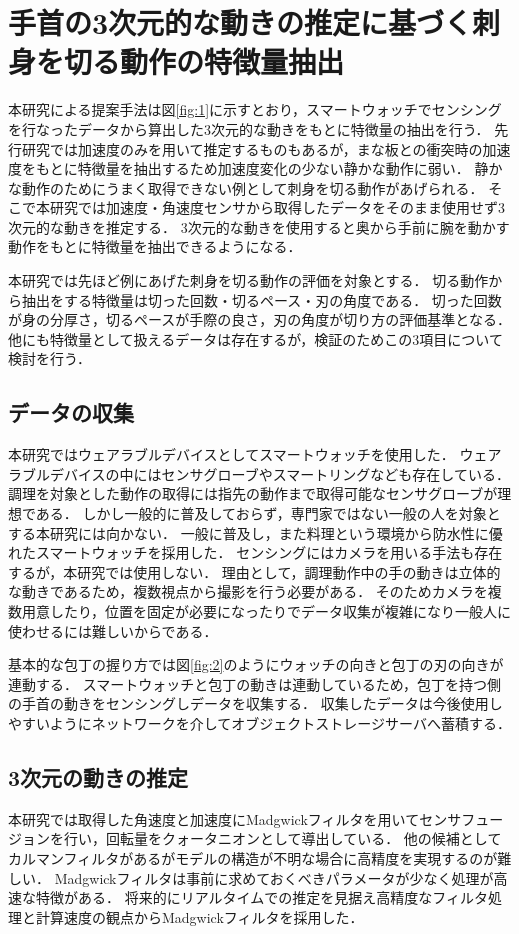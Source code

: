 \section{手首の3次元的な動きの推定に基づく刺身を切る動作の特徴量抽出}
本研究による提案手法は図\ref{fig:1}に示すとおり，スマートウォッチでセンシングを行なったデータから算出した3次元的な動きをもとに特徴量の抽出を行う．
先行研究\cite{kumazawaanalysis}では加速度のみを用いて推定するものもあるが，まな板との衝突時の加速度をもとに特徴量を抽出するため加速度変化の少ない静かな動作に弱い．
静かな動作のためにうまく取得できない例として刺身を切る動作があげられる．
そこで本研究では加速度・角速度センサから取得したデータをそのまま使用せず3次元的な動きを推定する．
3次元的な動きを使用すると奥から手前に腕を動かす動作をもとに特徴量を抽出できるようになる．

本研究では先ほど例にあげた刺身を切る動作の評価を対象とする．
切る動作から抽出をする特徴量は切った回数・切るペース・刃の角度である．
切った回数が身の分厚さ，切るペースが手際の良さ，刃の角度が切り方の評価基準となる．
他にも特徴量として扱えるデータは存在するが，検証のためこの3項目について検討を行う．



\subsection{データの収集}
本研究ではウェアラブルデバイスとしてスマートウォッチを使用した．
ウェアラブルデバイスの中にはセンサグローブやスマートリングなども存在している．
調理を対象とした動作の取得には指先の動作まで取得可能なセンサグローブが理想である．
しかし一般的に普及しておらず，専門家ではない一般の人を対象とする本研究には向かない．
一般に普及し，また料理という環境から防水性に優れたスマートウォッチを採用した．
センシングにはカメラを用いる手法も存在するが，本研究では使用しない．
理由として，調理動作中の手の動きは立体的な動きであるため，複数視点から撮影を行う必要がある．
そのためカメラを複数用意したり，位置を固定が必要になったりでデータ収集が複雑になり一般人に使わせるには難しいからである．

基本的な包丁の握り方では図\ref{fig:2}のようにウォッチの向きと包丁の刃の向きが連動する．
スマートウォッチと包丁の動きは連動しているため，包丁を持つ側の手首の動きをセンシングしデータを収集する．
収集したデータは今後使用しやすいようにネットワークを介してオブジェクトストレージサーバへ蓄積する．
\subsection{3次元の動きの推定}
本研究では取得した角速度と加速度にMadgwickフィルタを用いてセンサフュージョンを行い，回転量をクォータニオンとして導出している．
他の候補としてカルマンフィルタがあるがモデルの構造が不明な場合に高精度を実現するのが難しい．
Madgwickフィルタは事前に求めておくべきパラメータが少なく処理が高速な特徴がある．
将来的にリアルタイムでの推定を見据え高精度なフィルタ処理と計算速度の観点からMadgwickフィルタを採用した．



